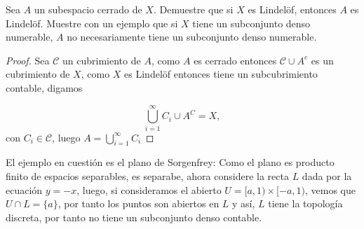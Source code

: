 
\item Sea $A$ un subespacio cerrado de $X$. Demuestre que si $X$ es Lindelöf, entonces $A$ es Lindelöf.  
Muestre con un ejemplo que si $X$ tiene un subconjunto denso numerable, $A$ no necesariamente tiene un subconjunto denso numerable.

\begin{proof}
    Sea $\mathcal{C}$ un cubrimiento de $A$, como $A$ es cerrado entonces $\mathcal{C}\cup A^c$ es un cubrimiento  de $X$, como $X$ es Lindelöf entonces tiene un subcubrimiento contable, digamos 

    $$\bigcup_{i=1}^{\infty}C_i\cup A^{C}=X, 
        $$
     con $C_i\in \mathcal{C}$, luego $A=\bigcup_{i=1}^{\infty}C_i$
\end{proof}

El ejemplo en cuestión es el plano de Sorgenfrey: Como el plano es producto finito de espacios separables, es separabe, ahora considere la recta $L$ dada por la ecuación $y=-x$, luego, si consideramos el abierto $U=[a,1)\times [-a,1)$, vemos que $U \cap L = \{a\}$, por tanto los puntos son abiertos en $L$ y así, $L$ tiene la topología discreta, por tanto no tiene un subconjunto denso contable.